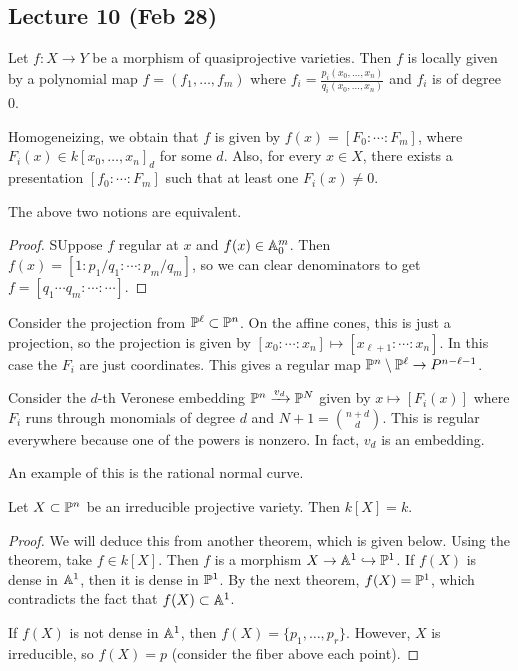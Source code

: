 \documentclass[twoside, 10pt]{article}
\begin{document}
    \subsection{Lecture 10 (Feb 28)}
Let $f:X \to Y$ be a morphism of quasiprojective varieties. Then $f$ is locally given by a polynomial map $f = (f_1, \ldots, f_m)$ where $f_i = \frac{p_i(x_0, \ldots, x_n)}{q_i(x_0, \ldots, x_n)}$ and $f_i$ is of degree $0$.

    Homogeneizing, we obtain that $f$ is given by $f(x) = [F_0:\cdots:F_m]$, where $F_i(x) \in k[x_0, \ldots, x_n]_d$ for some $d$. Also, for every $x \in X$, there exists a presentation $[f_0:\cdots:F_m]$ such that at least one $F_i(x) \neq 0$.

    \begin{prop}
        The above two notions are equivalent.
        \begin{proof}
            SUppose $f$ regular at $x$ and $f(x) \in \A^m_0$. Then $f(x) = [1:p_1/q_1:\cdots:p_m/q_m]$, so we can clear denominators to get $f = [q_1\cdots q_m:\cdots:\cdots]$.
        \end{proof}
    \end{prop}

    \begin{exm}
        Consider the projection from $\P^{\ell} \subset \P^n$. On the affine cones, this is just a projection, so the projection is given by $[x_0:\cdots:x_n] \mapsto [x_{\ell+1}:\cdots:x_n]$. In this case the $F_i$ are just coordinates. This gives a regular map $\P^n \setminus \P^{\ell} \to P^{n-\ell - 1}$.
    \end{exm}
    
    \begin{exm}
        Consider the $d$-th Veronese embedding $\P^n \xrightarrow{v_d} \P^N$ given by $x \mapsto [F_i(x)]$ where $F_i$ runs through monomials of degree $d$ and $N+1 = \binom{n+d}{d}$. This is regular everywhere because one of the powers is nonzero. In fact, $v_d$ is an embedding.

        An example of this is the rational normal curve.
    \end{exm}

    \begin{thm}
        Let $X \subset \P^n$ be an irreducible projective variety. Then $k[X] = k$.
        \begin{proof}
            We will deduce this from another theorem, which is given below. Using the theorem, take $f \in k[X]$. Then $f$ is a morphism $X \to \A^1 \hookrightarrow \P^1$. If $f(X)$ is dense in $\A^1$, then it is dense in $\P^1$. By the next theorem, $f(X) = \P^1$, which contradicts the fact that $f(X) \subset \A^1$. 

            If $f(X)$ is not dense in $\A^1$, then $f(X) = \{p_1, \ldots, p_r\}$. However, $X$ is irreducible, so $f(X) = p$ (consider the fiber above each point).
        \end{proof}
    \end{thm}
\end{document}
